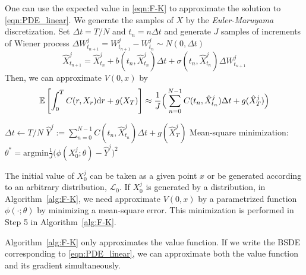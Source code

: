 \documentclass[11pt]{book}
\newcommand{\dr}{\text{\normalfont d}r}
\begin{document}
One can use the expected value in \eqref{eqn:F-K} to approximate the solution to \eqref{eqn:PDE_linear}. We generate the samples of $X$ by the \emph{Euler-Maruyama} discretization. Set $\Delta t = T/N$ and $t_n=n\Delta t$ and generate $J$ samples of increments of Wiener process $\Delta W_{t_{n+1}}^j=W_{t_{n+1}}^j-W_{t_{n}}^j\sim N(0,\Delta t)$
\begin{equation}
\label{eqn:Euler-Maruyama}
    \hat{X}^j_{t_{n+1}} = \hat{X}^j_{t_{n}} + b(t_n,\hat{X}_{t_n}^j)\Delta t+\sigma(t_n,\hat{X}_{t_n}^j)\Delta W_{t_{n+1}}^j
\end{equation}
Then, we can approximate $V(0,x)$ by
\[
\mathbb{E}\left[\int_0^T C(r,X_r){{\dr}}+g(X_T)\right]\approx\frac{1}{J}\Big(\sum_{n=0}^{N-1} C(t_n,\hat{X}_{t_n}^j)\Delta t+g(\hat{X}_T^j)\Big)
\]

\begin{algorithm}
        $\Delta t \gets T/N$\;
        $\hat{Y}^j:=\sum_{n=0}^{N-1}C(t_n,\hat{X}_{t_n}^j)\Delta t+g(\hat{X}_T^j)$\;
        Mean-square minimization: $\theta^*=\text{argmin}\frac{1}{J} \Big(\phi(X_0^j;\theta)-\hat{Y}^j\Big)^2$\;
        \caption{Feynman-Kac approximation for linear parabolic equations}
        \label{alg:F-K}
\end{algorithm}
The initial value of $X_0^j$ can be taken as a given point $x$ or be generated according to an arbitrary distribution, $\mathcal{L}_0$. 
If $X_0^j$ is generated by a distribution, in Algorithm~\ref{alg:F-K}, we need approximate $V(0,x)$ by a parametrized function $\phi(\cdot;\theta)$ by minimizing a mean-square error. This minimization is performed in Step 5 in  Algorithm~\ref{alg:F-K}.


Algorithm~\ref{alg:F-K} only approximates the value function. If we write the BSDE corresponding to \eqref{eqn:PDE_linear}, we can approximate both the value function and its gradient simultaneously. 
\end{document}
